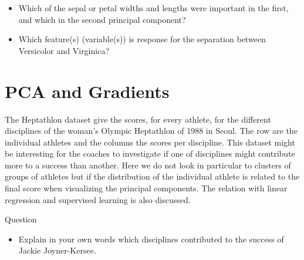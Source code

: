 \documentclass[
]{book}
\providecommand{\tightlist}{%
  \setlength{\itemsep}{0pt}\setlength{\parskip}{0pt}}
\begin{document}
\begin{itemize}
\item
  Which of the sepal or petal widths and lengths were important in the first, and which in the second principal component?
\item
  Which feature(s) (variable(s)) is response for the separation between Versicolor and Virginica?
\end{itemize}

\hypertarget{pca-and-gradients}{%
\chapter{PCA and Gradients}\label{pca-and-gradients}}

The Heptathlon dataset give the scores, for every athlete, for the different disciplines of the woman's Olympic Heptathlon of 1988 in Seoul. The row are the individual athletes and the columns the scores per discipline. This dataset might be interesting for the coaches to investigate if one of disciplines might contribute more to a success than another. Here we do not look in particular to clusters of groups of athletes but if the distribution of the individual athlete is related to the final score when visualizing the principal components.
The relation with linear regression and supervised learning is also discussed.

Question

\begin{itemize}
\tightlist
\item
  Explain in your own words which disciplines contributed to the success of Jackie Joyner-Kersee.
\end{itemize}
\end{document}
